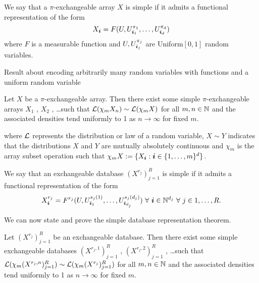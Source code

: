 We say that a $\pi$-exchangeable array $X$ is simple if it admits a functional representation of the form
\begin{equation}
  X_{\bm{i}} = F(U, U^{\pi_1}_{\bm{i}_1}, \dots, U^{\pi_d}_{\bm{i}_d})
\end{equation}
where $F$ is a measurable function and $U, U^{\pi_j}_{\bm{i}_j}$ are \iid Uniform$[0,1]$ random variables.

\begin{prop}
  \label{prop:hypercube}
  Result about encoding arbitrarily many random variables with functions and a uniform random variable
\end{prop}

\begin{thm}
  \label{thm:piex}
  Let $X$ be a $\pi$-exchangeable array.
  Then there exist some simple $\pi$-exchangeable arrays $X_1$ , $X_2$ , \dots such that
  $\mathcal{L}(\chi_m X_n) \sim \mathcal{L}(\chi_m X)$ for all $m,n \in \mathbb{N}$ and the associated densities tend
  uniformly to 1 as $n \to \infty$ for fixed $m$.
\end{thm}

where $\mathcal{L}$ represents the distribution or law of a random variable, $X \sim Y$ indicates that the distributions $X$ and $Y$ are mutually absolutely continuous and $\chi_m$ is the array subset operation such that $\chi_m X := \{X_{\bm{i}} : \bm{i} \in \{1,\dots,m\}^d\}$.

We say that an exchangeable database $(X^{r_j})_{j=1}^R$ is simple if it admits a functional representation of the form
\begin{equation}
  X^{r_j}_{\bm{i}} = F^{r_j}(U, U^{s_{j}(1)}_{\bm{i}_1},\dots,U^{s_{j}(d_j)}_{\bm{i}_{d_j}}) \,\, \forall \,\, \bm{i} \in \mathbb{N}^{d_j} \,\, \forall \,\, j \in {1,\dots,R}.
\end{equation}

We can now state and prove the simple database representation theorem.

\begin{thm}
  \label{thm:simple-database}
  Let $(X^{r_j})_{j=1}^R$ be an exchangeable database.
  Then there exist some simple exchangeable databases $(X^{r_j,1})_{j=1}^R$ , $(X^{r_j,2})_{j=1}^R$ , \dots such that
  $\mathcal{L}(\chi_m (X^{r_j,n})_{j=1}^R) \sim \mathcal{L}(\chi_m (X^{r_j})_{j=1}^R)$ for all $m,n \in \mathbb{N}$ and the associated densities tend
  uniformly to 1 as $n \to \infty$ for fixed $m$.
\end{thm}

